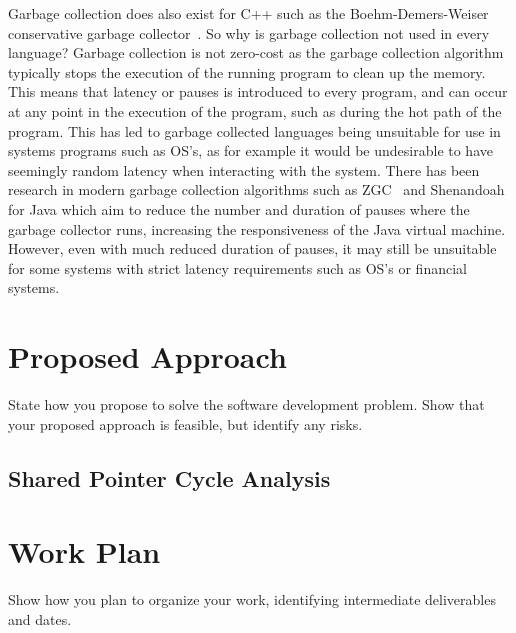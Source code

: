 \documentclass{proposal}
\begin{document}
    Garbage collection does also exist for C++ such as the Boehm-Demers-Weiser conservative garbage collector~\cite{boehm2002garbage}.
    So why is garbage collection not used in every language?
    Garbage collection is not zero-cost as the garbage collection algorithm typically stops the execution of the running program to clean up the memory.
    This means that latency or pauses is introduced to every program, and can occur at any point in the execution of the program, such as during the hot path of the program.
    This has led to garbage collected languages being unsuitable for use in systems programs such as OS's, as for example it would be undesirable to have seemingly random latency when interacting with the system.
    There has been research in modern garbage collection algorithms such as ZGC~\cite{ZGC} and Shenandoah~\cite{flood2016shenandoah} for Java which aim to reduce the number and duration of pauses where the garbage collector runs, increasing the responsiveness of the Java virtual machine.
    However, even with much reduced duration of pauses, it may still be unsuitable for some systems with strict latency requirements such as OS's or financial systems.




    \section{Proposed Approach}\label{sec:proposed-approach}

    State how you propose to solve the software development problem.
    Show that your proposed approach is feasible, but identify any risks.

    \subsection{Shared Pointer Cycle Analysis}\label{subsec:shared-pointer-cycle-analysis}



    \section{Work Plan}\label{sec:work-plan}

    Show how you plan to organize your work, identifying intermediate deliverables and dates.




    
    
\end{document}
